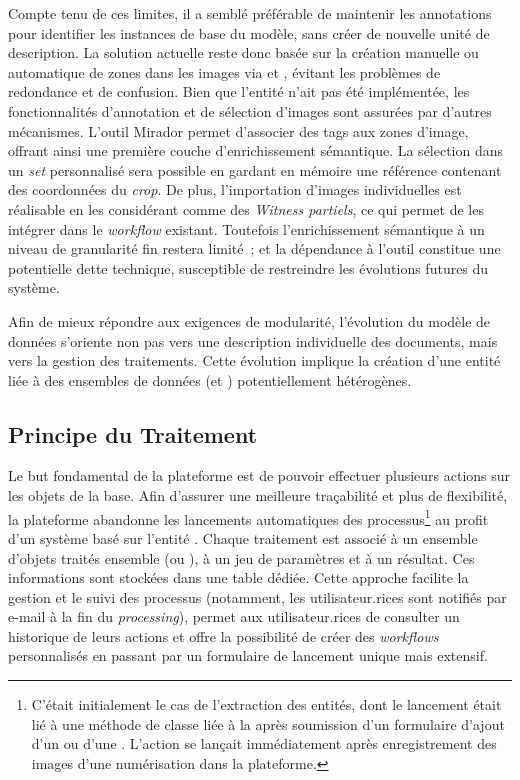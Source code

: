 Compte tenu de ces limites, il a semblé préférable de maintenir les
annotations \sas pour identifier les instances de base du modèle, sans
créer de nouvelle unité de description. La solution actuelle reste donc
basée sur la création manuelle ou automatique de zones dans les images
via \iiif et \sas, évitant les problèmes de redondance et de confusion.
Bien que l'entité \graphical n'ait pas été implémentée, les
fonctionnalités d'annotation et de sélection d'images sont assurées par
d'autres mécanismes. L'outil Mirador permet d'associer des tags aux
zones d'image, offrant ainsi une première couche d'enrichissement
sémantique. La sélection dans un \emph{set} personnalisé sera possible en
gardant en mémoire une référence contenant des coordonnées du
\emph{crop}. De plus, l'importation d'images individuelles est
réalisable en les considérant comme des \emph{Witness partiels}, ce qui
permet de les intégrer dans le \textit{workflow} existant. Toutefois
l'enrichissement sémantique à un niveau de granularité fin restera
limité~; et la dépendance à l'outil \sas constitue une potentielle dette
technique, susceptible de restreindre les évolutions futures du système.

Afin de mieux répondre aux exigences de modularité, l'évolution du
modèle de données s'oriente non pas vers une description individuelle
des documents, mais vers la gestion des traitements. Cette évolution
implique la création d'une entité \tr
liée à des ensembles de données (\ds et
\rs) potentiellement hétérogènes.

\hypertarget{principe-du-traitement}{%
\subsection{Principe du Traitement}\label{principe-du-traitement}}

Le but fondamental de la plateforme est de pouvoir effectuer plusieurs
actions sur les objets de la base. Afin d'assurer une meilleure
traçabilité et plus de flexibilité, la plateforme abandonne les
lancements automatiques des processus\footnote{C'était initialement le
  cas de l'extraction des entités, dont le lancement était lié à une
  méthode de classe liée à la \digit après soumission d'un
  formulaire d'ajout d'un \wit ou d'une \ser. L'action se
  lançait immédiatement après enregistrement des images d'une
  numérisation dans la plateforme.} au profit d'un système basé sur
l'entité \tr. Chaque traitement est associé à un ensemble
d'objets traités ensemble (\ds ou \rs), à un jeu de
paramètres et à un résultat. Ces informations sont stockées dans une
table dédiée. Cette approche facilite la gestion et le suivi des
processus (notamment, les utilisateur.rices sont notifiés par e-mail à la fin
du \textit{processing}), permet aux utilisateur.rices de consulter un historique de
leurs actions et offre la possibilité de créer des \textit{workflows}
personnalisés en passant par un formulaire de lancement unique mais
extensif.

